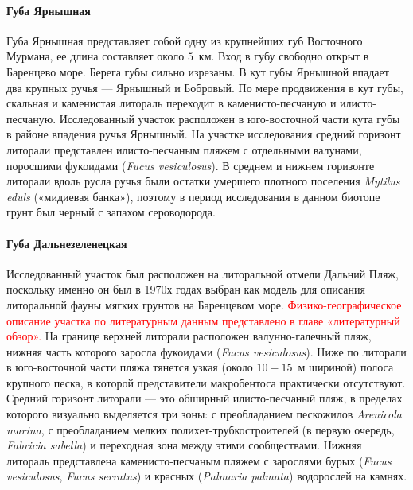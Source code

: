     \paragraph{Губа Ярнышная}
Губа Ярнышная представляет собой одну из крупнейших губ Восточного Мурмана, ее длина составляет около $5$~км. 
Вход в губу свободно открыт в Баренцево море. 
Берега губы сильно изрезаны. 
В кут губы Ярнышной впадает два крупных ручья --- Ярнышный и Бобровый. 
По мере продвижения в кут губы, скальная и каменистая литораль переходит в каменисто-песчаную и илисто-песчаную. 
Исследованный участок расположен в юго-восточной части кута губы в районе впадения ручья Ярнышный.
На   участке   исследования   средний   горизонт   литорали   представлен   илисто-песчаным пляжем   с   отдельными   валунами,   поросшими   фукоидами   ({\it Fucus   vesiculosus}).   
В   среднем   и нижнем горизонте литорали вдоль русла ручья были остатки умершего плотного поселения  {\it Mytilus eduls} («мидиевая банка»), поэтому в период исследования в данном биотопе грунт был черный с запахом сероводорода.

    \paragraph{Губа Дальнезеленецкая}
Исследованный   участок   был   расположен   на   литоральной   отмели   Дальний   Пляж, поскольку именно он был в 1970х годах выбран как модель для описания литоральной фауны мягких   грунтов   на   Баренцевом   море.   
\textcolor{red}{Физико-географическое   описание   участка   по литературным данным представлено в главе «литературный обзор».}
На   границе   верхней   литорали   расположен   валунно-галечный   пляж,  нижняя   часть которого заросла фукоидами ({\it Fucus vesiculosus}). 
Ниже по литорали в юго-восточной части пляжа   тянется   узкая   (около   $10-15$~м   шириной)   полоса   крупного   песка,   в   которой представители макробентоса практически отсутствуют.
Средний   горизонт   литорали --- это   обширный   илисто-песчаный   пляж,   в  пределах которого визуально выделяется три зоны: с преобладанием пескожилов  {\it Arenicola marina}, с преобладанием   мелких   полихет-трубкостроителей   (в   первую   очередь, {\it Fabricia   sabella})   и переходная   зона   между   этими   сообществами.   
Нижняя   литораль   представлена   каменисто-песчаным пляжем с зарослями бурых ({\it Fucus vesiculosus}, {\it Fucus serratus}) и красных ({\it Palmaria  palmata}) водорослей на камнях.

